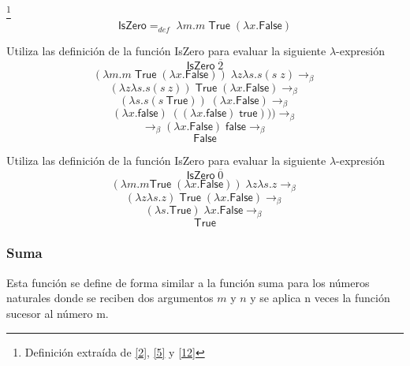 	\begin{definition}\footnote{Definición extraída de \hyperlink{2}{[2]},  \hyperlink{5}{[5]} y \hyperlink{12}{[12]}}
            $$\textsf{IsZero} =_{def}  \; \lambda m. m\;\textsf{True} \;(\lambda x.\textsf{False})$$
        \end{definition}

        \begin{exercise}
            Utiliza las definición de la función \textsf{IsZero} para evaluar la siguiente $\lambda$-expresión
            \[
                \textsf{IsZero}  \; \overline{2}
            \]
            \[
                (\lambda m. m\;\textsf{True} \;(\lambda x.\textsf{False})) \; \lambda z\lambda s.s(s\;z) \rightarrow_\beta 
            \]
		\[
			(\lambda z\lambda s.s(s\:z)) \; \textsf{True} \; (\lambda x.\textsf{False})  \rightarrow_\beta 
		\]
            \[
                	(\lambda s.s(s\: \textsf{True})) \; (\lambda x.\textsf{False}) \rightarrow_\beta  
            \]
		\[
			(\lambda x.\textsf{false}) \; ((\lambda x.\textsf{false}) \; \textsf{true}))) \rightarrow_\beta  
		\]
            \[
                 \rightarrow_\beta  (\lambda x.\textsf{False}) \; \textsf{false} \rightarrow_\beta 
            \]
		\[
			\textsf{False}
		\]

        \end{exercise}

        \begin{exercise}
            Utiliza las definición de la función \textsf{IsZero} para evaluar la siguiente $\lambda$-expresión
            \[
                \textsf{IsZero} \; \overline{0}
            \]
            \[
                (\lambda m. m\textsf{True} \; (\lambda x.\textsf{False})) \; \lambda z\lambda s.z \rightarrow_\beta 
            \]
		\[
			(\lambda z\lambda s.z) \; \textsf{True} \; (\lambda x.\textsf{False}) \rightarrow_\beta 
		\]
            \[
                   (\lambda s.\textsf{True}) \; \lambda x.\textsf{False} \rightarrow_\beta 
            \]
		\[
			\textsf{True}
		\]
        \end{exercise}
        

    \subsubsection{Suma}
        Esta función se define de forma similar a la función suma para los números naturales  donde se reciben dos argumentos $m$ y $n$ y se aplica n veces la función sucesor al número m.

